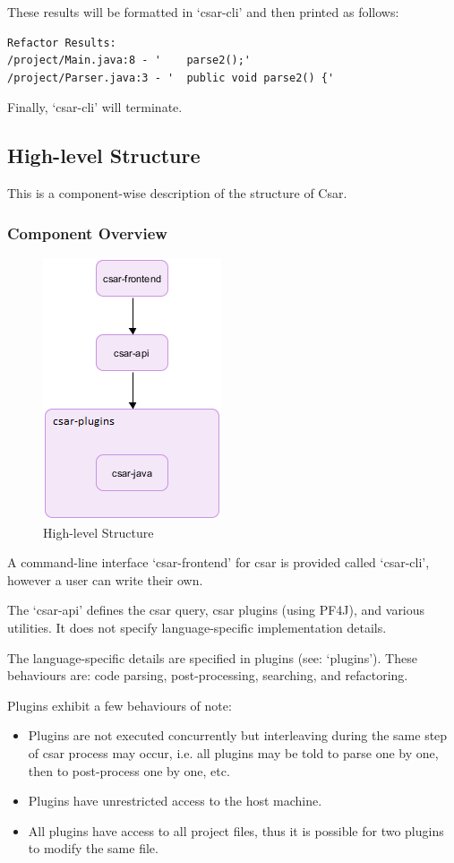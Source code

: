 \documentclass[12pt, letterpaper]{article}
\begin{document}
These results will be formatted in `csar-cli' and then printed as follows:
\begin{lstlisting}
Refactor Results:
/project/Main.java:8 - '    parse2();'
/project/Parser.java:3 - '  public void parse2() {'
\end{lstlisting}

Finally, `csar-cli' will terminate.

\subsection{High-level Structure}
This is a component-wise description of the structure of Csar.

\subsubsection{Component Overview}
\begin{figure}[!hb]
  \centering
  \caption{High-level Structure}
  \includegraphics{figure-1}
\end{figure}

A command-line interface `csar-frontend' for csar is provided called `csar-cli', however a user can write their own.

The `csar-api' defines the csar query, csar plugins (using PF4J), and various utilities.
It does not specify language-specific implementation details.

The language-specific details are specified in plugins (see: `plugins').
These behaviours are: code parsing, post-processing, searching, and refactoring.

Plugins exhibit a few behaviours of note:
\begin{itemize}
  \item Plugins are not executed concurrently but interleaving during the same step of csar process may occur, i.e. all plugins may be told to parse one by one, then to post-process one by one, etc.
  \item Plugins have unrestricted access to the host machine.
  \item All plugins have access to all project files, thus it is possible for two plugins to modify the same file.
\end{itemize}
\end{document}
